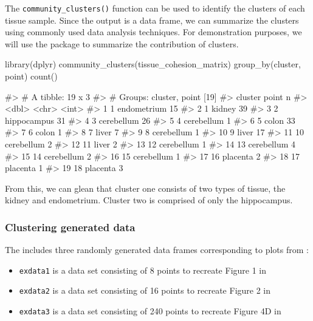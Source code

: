The \texttt{community\_clusters()} function can be used to identify the
clusters of each tissue sample. Since the output is a data frame, we can
summarize the clusters using commonly used data analysis techniques. For
demonstration purposes, we will use the  package to
summarize the contribution of clusters.

\begin{Schunk}
\begin{Sinput}
library(dplyr)
community_clusters(tissue_cohesion_matrix) %
  group_by(cluster, point) %
  count()
\end{Sinput}
\begin{Soutput}
#> # A tibble: 19 x 3
#> # Groups:   cluster, point [19]
#>    cluster point           n
#>      <dbl> <chr>       <int>
#>  1       1 endometrium    15
#>  2       1 kidney         39
#>  3       2 hippocampus    31
#>  4       3 cerebellum     26
#>  5       4 cerebellum      1
#>  6       5 colon          33
#>  7       6 colon           1
#>  8       7 liver           7
#>  9       8 cerebellum      1
#> 10       9 liver          17
#> 11      10 cerebellum      2
#> 12      11 liver           2
#> 13      12 cerebellum      1
#> 14      13 cerebellum      4
#> 15      14 cerebellum      2
#> 16      15 cerebellum      1
#> 17      16 placenta        2
#> 18      17 placenta        1
#> 19      18 placenta        3
\end{Soutput}
\end{Schunk}

From this, we can glean that cluster one consists of two types of
tissue, the kidney and endometrium. Cluster two is comprised of only the
hippocampus.

\hypertarget{clustering-generated-data}{%
\subsubsection{Clustering generated
data}\label{clustering-generated-data}}

The  includes three randomly generated data frames
corresponding to plots from \citet{berenhaut2022social}:

\begin{itemize}
\tightlist
\item
  \texttt{exdata1} is a data set consisting of 8 points to recreate
  Figure 1 in \citet{berenhaut2022social}
\item
  \texttt{exdata2} is a data set consisting of 16 points to recreate
  Figure 2 in \citet{berenhaut2022social}
\item
  \texttt{exdata3} is a data set consisting of 240 points to recreate
  Figure 4D in \citet{berenhaut2022social}
\end{itemize}

